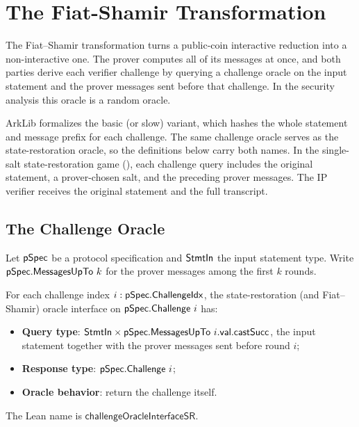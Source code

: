 \section{The Fiat-Shamir Transformation}\label{sec:fiat_shamir}

The Fiat--Shamir transformation turns a public-coin interactive reduction into a non-interactive
one. The prover computes all of its messages at once, and both parties derive each verifier
challenge by querying a challenge oracle on the input statement and the prover messages sent before
that challenge. In the security analysis this oracle is a random oracle.

ArkLib formalizes the basic (or slow) variant, which hashes the whole statement and message prefix
for each challenge. The same challenge oracle serves as the state-restoration oracle, so the
definitions below carry both names. In the single-salt state-restoration game
(), each challenge query includes the original statement, a
prover-chosen salt, and the preceding prover messages. The IP verifier receives the original
statement and the full transcript.

\subsection{The Challenge Oracle}\label{sec:fiat_shamir_oracle_interface}

Let $\mathsf{pSpec}$ be a protocol specification and $\mathsf{StmtIn}$ the input statement type. Write
$\pSpec.\MessagesUpTo\ k$ for the prover messages among the first $k$ rounds.

\begin{definition}
    \label{def:fiat_shamir_challenge_oracle_interface}
    For each challenge index $i : \mathsf{pSpec}.\mathsf{ChallengeIdx}$, the state-restoration (and Fiat--Shamir)
    oracle interface on $\pSpec.\Challenge\ i$ has:
    \begin{itemize}
        \item \textbf{Query type}: $\mathsf{StmtIn} \times \mathsf{pSpec}.\mathsf{MessagesUpTo}\ i.\mathsf{val}.\mathsf{castSucc}$,
        the input statement together with the prover messages sent before round $i$;
        \item \textbf{Response type}: $\pSpec.\Challenge\ i$;
        \item \textbf{Oracle behavior}: return the challenge itself.
    \end{itemize}
    The Lean name is $\mathsf{challengeOracleInterfaceSR}$.
    \leanok
\end{definition}

